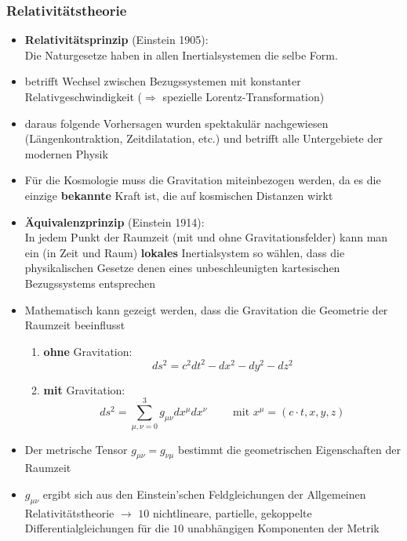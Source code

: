 \subsubsection{Relativitätstheorie}
\begin{itemize}
	\item \textbf{Relativitätsprinzip} (Einstein 1905):\\
		Die Naturgesetze haben in allen Inertialsystemen die selbe Form.
	\item betrifft Wechsel zwischen Bezugssystemen mit konstanter Relativgeschwindigkeit ($\Rightarrow$ spezielle Lorentz-Transformation)
	\item daraus folgende Vorhersagen wurden spektakulär nachgewiesen (Längenkontraktion, Zeitdilatation, etc.) und betrifft alle Untergebiete der modernen Physik
	\item Für die Kosmologie muss die Gravitation miteinbezogen werden, da es die einzige \textbf{bekannte} Kraft ist, die auf kosmischen Distanzen wirkt
	\item \textbf{Äquivalenzprinzip} (Einstein 1914):\\
		In jedem Punkt der Raumzeit (mit und ohne Gravitationsfelder) kann man ein (in Zeit und Raum) \textbf{lokales} Inertialsystem so wählen, dass die physikalischen Gesetze denen eines unbeschleunigten kartesischen Bezugssystems entsprechen
	\item Mathematisch kann gezeigt werden, dass die Gravitation die Geometrie der Raumzeit beeinflusst
		\begin{enumerate}[label={$(\roman*)$}]
			\item \textbf{ohne} Gravitation:
				\begin{equation*}
					ds^2=c^2dt^2-dx^2-dy^2-dz^2
				\end{equation*}
			\item \textbf{mit} Gravitation:
				\begin{equation*}
					ds^2=\sum\limits_{\mu,\nu=0}^3g_{\mu\nu}dx^\mu dx^\nu \qquad \text{ mit } x^\mu=(c\cdot t, x, y, z)
				\end{equation*}
		\end{enumerate}
	\item Der metrische Tensor $g_{\mu\nu}=g_{\nu\mu}$ bestimmt die geometrischen Eigenschaften der Raumzeit
	\item $g_{\mu\nu}$ ergibt sich aus den Einstein'schen Feldgleichungen der Allgemeinen Relativitätstheorie $\rightarrow$ $\num{10}$ nichtlineare, partielle, gekoppelte Differentialgleichungen für die $\num{10}$ unabhängigen Komponenten der Metrik

\end{itemize}
